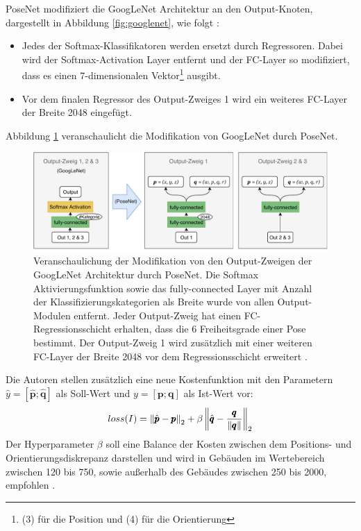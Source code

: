 PoseNet modifiziert die GoogLeNet Architektur an den Output-Knoten, dargestellt in Abbildung \ref{fig:googlenet}, wie folgt \cite{kendallPoseNetConvolutionalNetwork2015}:
\begin{itemize}
	\item Jedes der Softmax-Klassifikatoren werden ersetzt durch Regressoren. Dabei wird der Softmax-Activation Layer entfernt und der FC-Layer so modifiziert, dass es einen 7-dimensionalen Vektor\footnote{(3) für die Position und (4) für die Orientierung} ausgibt.
	\item Vor dem finalen Regressor des Output-Zweiges 1 wird ein weiteres FC-Layer der Breite 2048 eingefügt.

\end{itemize}
Abbildung \ref{fig:posenet_mods} veranschaulicht die Modifikation von GoogLeNet durch PoseNet.
 \begin{figure}
	\centering
	\includegraphics[width=\textwidth]{images/googlenet/posenet_diagram2.pdf}
	\caption{Veranschaulichung der Modifikation von den Output-Zweigen der GoogLeNet Architektur durch PoseNet. Die Softmax Aktivierungsfunktion sowie das fully-connected Layer mit Anzahl der Klassifizierungskategorien als Breite wurde von allen Output-Modulen entfernt. Jeder Output-Zweig hat einen FC-Regressionsschicht erhalten, dass die 6 Freiheitsgrade einer Pose bestimmt. Der Output-Zweig 1 wird zusätzlich mit einer weiteren FC-Layer der Breite 2048 vor dem Regressionsschicht erweitert \cite{kendallPoseNetConvolutionalNetwork2015}.}
	\label{fig:posenet_mods}
\end{figure}

Die Autoren \citet{kendallPoseNetConvolutionalNetwork2015} stellen zusätzlich eine neue Kostenfunktion mit den Parametern $\hat{y} = [\hat{\pmb{p}};\hat{\pmb{q}}]$ als Soll-Wert und $y = [\pmb{p};\pmb{q}]$ als Ist-Wert vor:
\begin{equation}
	\label{eq:posenet_loss}
	loss(I) = \left\lVert \hat{\pmb{p}} - \pmb{p} \right\rVert_2 + \beta \left\lVert \hat{\pmb{q}} - \frac{\pmb{q}}{\left\lVert\pmb{q}\right\rVert}\right\rVert_2
\end{equation}
Der Hyperparameter $\beta$ soll eine Balance der Kosten zwischen dem Positions- und Orientierungsdiskrepanz darstellen und wird in Gebäuden im Wertebereich zwischen 120 bis 750, sowie außerhalb des Gebäudes zwischen 250 bis 2000, empfohlen \cite{kendallPoseNetConvolutionalNetwork2015}. 
